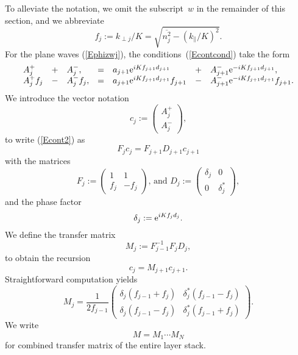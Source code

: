 To alleviate the notation,
we omit the subscript~$w$ in the remainder of this section,
and we abbreviate
\begin{equation}
  f_j := k_{\perp j}/K = \sqrt{\overline{n_j^2}-(k_\parallel/K)^2}.
\end{equation}
For the plane waves (\ref{Ephizwj}),
the conditions~(\ref{Econtcond}) take the form
\begin{equation}\label{Econt2}
  \begin{array}{lclclcl}
  A^+_j &+& A^-_j,
  &=&
  a_{j+1}\text{e}^{iKf_{j+1}d_{j+1}} &+& A^-_{j+1}\text{e}^{-iKf_{j+1}d_{j+1}},
  \\
  A^+_j f_j  &-& A^-_j f_j,
  &=&
 a_{j+1}\text{e}^{iKf_{j+1}d_{j+1}} f_{j+1} &-& A^-_{j+1}\text{e}^{-iKf_{j+1}d_{j+1}} f_{j+1}.
  \end{array}
\end{equation}
We introduce the vector notation
\begin{equation}\label{Evecc}
  c_j := \left( \begin{array}{c}A^+_j\\A^-_j\end{array} \right),
\end{equation}
to write (\ref{Econt2}) as
\begin{equation}\label{EFcFDc}
  F_j c_j = F_{j+1} D_{j+1} c_{j+1}
\end{equation}
with the matrices
\begin{equation}
  F_j := \left(\begin{array}{cc}1&1\\f_j&-f_j\end{array}\right)\text{, and }
  D_j := \left(\begin{array}{cc}\delta_j&0\\0&\delta_j^*\end{array}\right),
\end{equation}
and the phase factor
\begin{equation}
   \delta_j := \text{e}^{iKf_jd_j}.
\end{equation}
We define the transfer matrix
\begin{equation}\label{Edef_M}
  M_j
  := F_{j-1}^{-1}F_j D_j,
\end{equation}
to obtain the recursion 
\begin{equation}\label{EcMc}
  c_j = M_{j+1} c_{j+1}.
\end{equation}
Straightforward computation yields
\begin{equation}
  M_j
   = \frac{1}{2f_{j-1}}
   \left(\begin{array}{cc}
       \delta_j(f_{j-1}+f_j)&\delta_j^*(f_{j-1}-f_j)\\
       \delta_j(f_{j-1}-f_j)&\delta_j^*(f_{j-1}+f_j)
   \end{array}\right).
\end{equation}
We write
\begin{equation}
   M = M_1 \cdots M_N
\end{equation}
for combined transfer matrix of the entire layer stack.

